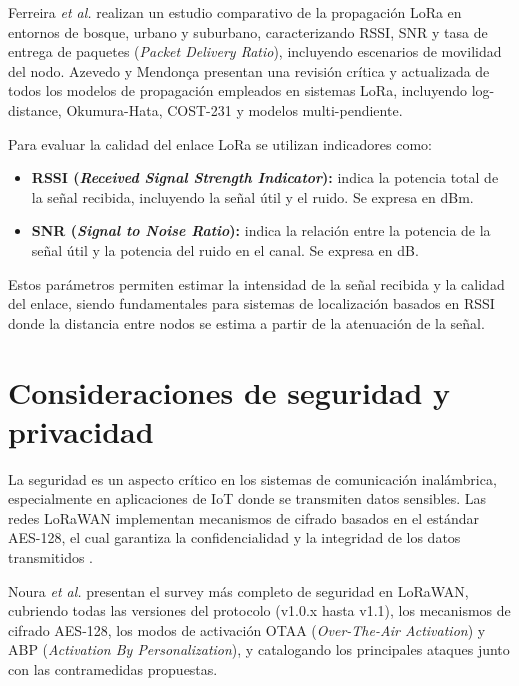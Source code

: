 Ferreira \textit{et al.} \cite{ferreira2020propagation} realizan un estudio comparativo de la propagación LoRa en entornos de bosque, urbano y suburbano, caracterizando RSSI, SNR y tasa de entrega de paquetes (\textit{Packet Delivery Ratio}), incluyendo escenarios de movilidad del nodo. Azevedo y Mendonça \cite{azevedo2024review} presentan una revisión crítica y actualizada de todos los modelos de propagación empleados en sistemas LoRa, incluyendo log-distance, Okumura-Hata, COST-231 y modelos multi-pendiente.

Para evaluar la calidad del enlace LoRa se utilizan indicadores como:

\begin{itemize}
    \item \textbf{RSSI (\textit{Received Signal Strength Indicator}):} indica la potencia total de la señal recibida, incluyendo la señal útil y el ruido. Se expresa en dBm.
    \item \textbf{SNR (\textit{Signal to Noise Ratio}):} indica la relación entre la potencia de la señal útil y la potencia del ruido en el canal. Se expresa en dB.
\end{itemize}

Estos parámetros permiten estimar la intensidad de la señal recibida y la calidad del enlace, siendo fundamentales para sistemas de localización basados en RSSI donde la distancia entre nodos se estima a partir de la atenuación de la señal.

\section{Consideraciones de seguridad y privacidad}
\label{sec:seguridad}

La seguridad es un aspecto crítico en los sistemas de comunicación inalámbrica, especialmente en aplicaciones de IoT donde se transmiten datos sensibles. Las redes LoRaWAN implementan mecanismos de cifrado basados en el estándar AES-128, el cual garantiza la confidencialidad y la integridad de los datos transmitidos \cite{noura2020security}.

Noura \textit{et al.} \cite{noura2020security} presentan el survey más completo de seguridad en LoRaWAN, cubriendo todas las versiones del protocolo (v1.0.x hasta v1.1), los mecanismos de cifrado AES-128, los modos de activación OTAA (\textit{Over-The-Air Activation}) y ABP (\textit{Activation By Personalization}), y catalogando los principales ataques junto con las contramedidas propuestas.

